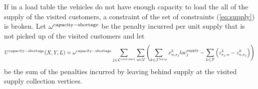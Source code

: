 If in a load table the vehicles do not have enough capacity to load the all of the supply of the visited customers, a  constraint of the set of constraints
(\ref{eq:supply}) is broken.
Let  $\omega^{\rm capacity-shortage}$ be the penalty incurred per unit supply that is not picked up of the visited customers and let
\begin{align}
  \label{pen:load}
	U^{\rm capacity-shortage}(X,Y,L) =
	\omega^{\rm capacity-shortage}
	\sum_{j \in \mathcal L^{\rm customer}}
	\sum_{u \in \mathcal V}
	\left(
	\sum_{k \in \mathcal F^{\rm lorry} }
	x^k_{u,s_j}
	loc_j^{\rm supply} -
	\sum_{ k \in \mathcal F }
	\left(
		z^k_{s_j,u}
	-
		z^k_{u,s_j}
	\right)
   \right)
\end{align}
be the sum of the  penalties incurred by leaving behind supply at the visited supply collection vertices. \\

